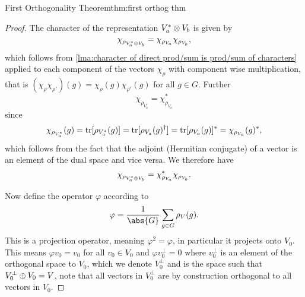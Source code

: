 \begin{thm}{First Orthogonality Theorem}{thm:first orthog thm}
\begin{proof}
        The character of the representation \(V_a^* \otimes V_b\) is
        given by
        \begin{equation}
            \chi_{\rho_{V_a^* \otimes V_b}} = \chi_{\rho_{V_a}}
            \chi_{\rho_{V_b}},
        \end{equation}
        which follows from \cref{lma:character of direct prod/sum is
            prod/sum of characters} applied to each component of the vectors \(\chi_{\rho}\)
        with component wise multiplication, that is \((\chi_\rho \chi_{\rho'})(g) =
        \chi_\rho(g)\chi_{\rho'}(g)\) for all \(g \in G\).
        Further
        \begin{equation}
            \chi_{\rho_{V_a^*}} = \chi_{\rho_{V_a}}^*
        \end{equation}
        since
        \begin{equation}
            \chi_{\rho_{V_a^*}}(g) = \operatorname{tr}[\rho_{V_a^*}(g)] =
            \operatorname{tr}[\rho_{V_a}(g)^\dagger] = \operatorname{tr}[\rho_{V_a}(g)]^* = \chi_{\rho_{V_a}}(g)^*,
        \end{equation}
        which follows from the fact that the adjoint (Hermitian conjugate)
        of a vector is an element of the dual space and vice versa.
        We therefore have
        \begin{equation}
            \chi_{\rho_{V_a^* \otimes V_b}} =
            \chi_{\rho_{V_a}}^*\chi_{\rho_{V_b}}.
        \end{equation}
        
        Now define the operator \(\varphi\) according to
        \begin{equation}
            \varphi = \frac{1}{\abs{G}} \sum_{g \in G} \rho_V(g).
        \end{equation}
        This is a projection operator, meaning \(\varphi^2 = \varphi\), in
        particular it projects onto \(V_0\).
        This means \(\varphi v_0 = v_0\) for all \(v_0 \in V_0\) and
        \(\varphi v_0^\perp = 0\) where \(v_0^\perp\) is an element of the orthogonal
        space to \(V_0\), which we denote \(V_0^\perp\) and is the space such that
        \(V_0^\perp \oplus V_0 = V\), note that all vectors in \(V_0^\perp\) are by
        construction orthogonal to all vectors in \(V_0\).
        

\end{proof}
\end{thm}
